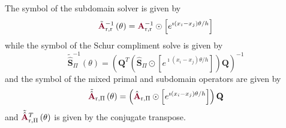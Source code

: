 \begin{definition}
The symbol of the subdomain solver is given by
\begin{equation}
\tilde{\color{burgundy}\mathbf{A}}_{\text{r}, \text{r}}^{-1} \left( \theta \right) = {\color{burgundy}\mathbf{A}}_{\text{r}, \text{r}}^{-1} \odot \left[ e^{\imath \left( x_i - x_j \right) \theta / h} \right]
\end{equation}
while the symbol of the Schur compliment solve is given by
\begin{equation}
\tilde{\hat{\mathbf{S}}}_{\Pi}^{-1} \left( \theta \right) = \left( \mathbf{Q}^T \left( \hat{\mathbf{S}}_{\Pi} \odot \left[ e^{\imath \left( x_i - x_j \right) \theta / h} \right] \right) \mathbf{Q} \right)^{-1}
\end{equation}
and the symbol of the mixed primal and subdomain operators are given by
\begin{equation}
\tilde{\hat{\color{burgundy}\mathbf{A}}}\color{black}_{\text{r}, \Pi} \left( \theta \right) = \left( \hat{\color{burgundy}\mathbf{A}}_{\text{r}, \Pi} \odot \left[ e^{\imath \left( x_i - x_j \right) \theta / h} \right] \right) \mathbf{Q}
\end{equation}
and $\tilde{\hat{\color{burgundy}\mathbf{A}}}\color{black}_{\text{r}, \Pi}^T \left( \theta \right)$ is given by the conjugate transpose.
\label{def:subassembled_symbol}
\end{definition}
